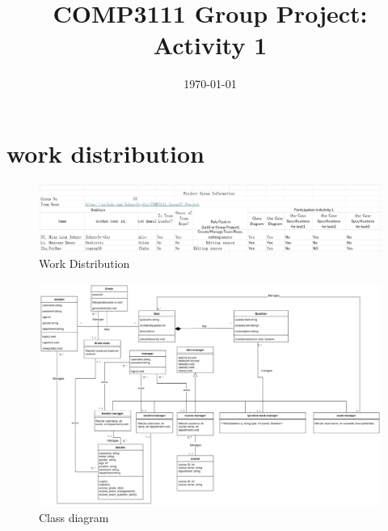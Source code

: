 \documentclass{article}
\title{COMP3111 Group Project: Activity 1}
\date{\today}
\begin{document}
\maketitle
\section{work distribution}
\begin{figure}[h!]
    \centering
    \includegraphics[width=\textwidth]{work_distribution.png}
    \caption{Work Distribution}
\end{figure}

    

\begin{figure}[h!]
    \centering
    \includegraphics[width=\textwidth]{class_diagram.png}
    \caption{Class diagram}
\end{figure}
\end{document}
